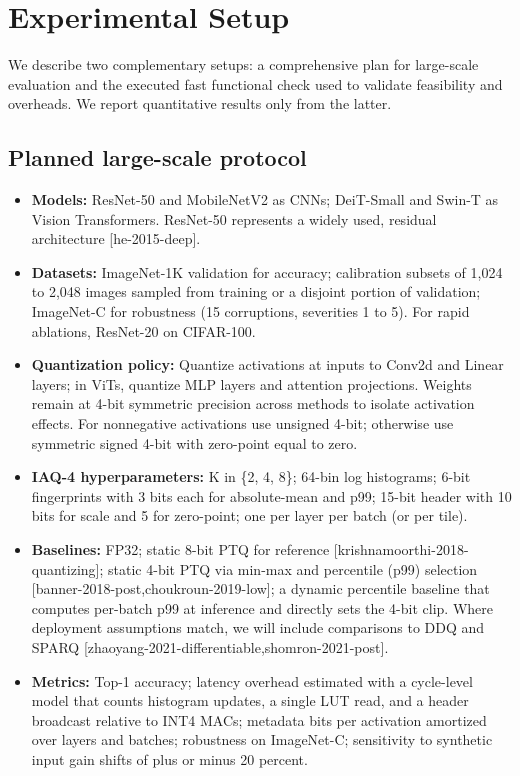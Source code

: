 \documentclass{article}
\begin{document}
\section{Experimental Setup}
We describe two complementary setups: a comprehensive plan for large-scale evaluation and the executed fast functional check used to validate feasibility and overheads. We report quantitative results only from the latter.

\subsection{Planned large-scale protocol}
\begin{itemize}
\item \textbf{Models:} ResNet-50 and MobileNetV2 as CNNs; DeiT-Small and Swin-T as Vision Transformers. ResNet-50 represents a widely used, residual architecture [he-2015-deep].
\item \textbf{Datasets:} ImageNet-1K validation for accuracy; calibration subsets of 1,024 to 2,048 images sampled from training or a disjoint portion of validation; ImageNet-C for robustness (15 corruptions, severities 1 to 5). For rapid ablations, ResNet-20 on CIFAR-100.
\item \textbf{Quantization policy:} Quantize activations at inputs to Conv2d and Linear layers; in ViTs, quantize MLP layers and attention projections. Weights remain at 4-bit symmetric precision across methods to isolate activation effects. For nonnegative activations use unsigned 4-bit; otherwise use symmetric signed 4-bit with zero-point equal to zero.
\item \textbf{IAQ-4 hyperparameters:} K in \{2, 4, 8\}; 64-bin log histograms; 6-bit fingerprints with 3 bits each for absolute-mean and p99; 15-bit header with 10 bits for scale and 5 for zero-point; one per layer per batch (or per tile).
\item \textbf{Baselines:} FP32; static 8-bit PTQ for reference [krishnamoorthi-2018-quantizing]; static 4-bit PTQ via min-max and percentile (p99) selection [banner-2018-post,choukroun-2019-low]; a dynamic percentile baseline that computes per-batch p99 at inference and directly sets the 4-bit clip. Where deployment assumptions match, we will include comparisons to DDQ and SPARQ [zhaoyang-2021-differentiable,shomron-2021-post].
\item \textbf{Metrics:} Top-1 accuracy; latency overhead estimated with a cycle-level model that counts histogram updates, a single LUT read, and a header broadcast relative to INT4 MACs; metadata bits per activation amortized over layers and batches; robustness on ImageNet-C; sensitivity to synthetic input gain shifts of plus or minus 20 percent.

\end{itemize}
\end{document}

